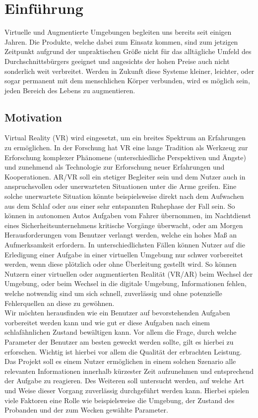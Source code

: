 \chapter{Einführung}

Virtuelle und Augmentierte Umgebungen begleiten uns bereits seit einigen Jahren. Die Produkte, welche dabei zum Einsatz kommen, sind zum jetzigen Zeitpunkt aufgrund der unpraktischen Größe nicht für das alltägliche Umfeld des Durchschnittsbürgers geeignet und angesichts der hohen Preise auch nicht sonderlich weit verbreitet.
Werden in Zukunft diese Systeme kleiner, leichter, oder sogar permanent mit dem menschlichen Körper verbunden, wird es möglich sein, jeden Bereich des Lebens zu augmentieren. 

\section{Motivation}

Virtual Reality (VR) wird eingesetzt, um ein breites Spektrum an Erfahrungen zu ermöglichen. In der Forschung hat VR eine lange Tradition als Werkzeug zur Erforschung komplexer Phänomene (unterschiedliche Perspektiven und Ängste) und zunehmend als Technologie zur Erforschung neuer Erfahrungen und Kooperationen.
AR/VR soll ein stetiger Begleiter sein und dem Nutzer auch in anspruchsvollen oder unerwarteten Situationen unter die Arme greifen.
Eine solche unerwartete Situation könnte beispielsweise direkt nach dem Aufwachen aus dem Schlaf oder aus einer sehr entspannten Ruhephase der Fall sein. So können in autonomen Autos Aufgaben vom Fahrer übernommen, im Nachtdienst eines Sicherheitsunternehmens kritische Vorgänge überwacht, oder am Morgen Herausforderungen vom Benutzer verlangt werden, welche ein hohes Maß an Aufmerksamkeit erfordern. 
In unterschiedlichsten Fällen können Nutzer auf die Erledigung einer Aufgabe in einer virtuellen Umgebung nur schwer vorbereitet werden, wenn diese plötzlich oder ohne Überleitung gestellt wird.
So können Nutzern einer virtuellen oder augmentierten Realität (VR/AR) beim Wechsel der Umgebung, oder beim Wechsel in die digitale Umgebung, Informationen fehlen, welche notwendig sind um sich schnell, zuverlässig und ohne potenzielle Fehlerquellen an diese zu gewöhnen.\\
Wir möchten herausfinden wie ein Benutzer auf bevorstehenden Aufgaben vorbereitet werden kann und wie gut er diese Aufgaben nach einem schlafähnlichen Zustand bewältigen kann. Vor allem die Frage, durch welche Parameter der Benutzer am besten geweckt werden sollte, gilt es hierbei zu erforschen. Wichtig ist hierbei vor allem die Qualität der erbrachten Leistung.\\
Das Projekt \projectName soll es einem Nutzer ermöglichen in einem solchen Szenario alle relevanten Informationen innerhalb kürzester Zeit aufzunehmen und entsprechend der Aufgabe zu reagieren. Des Weiteren soll untersucht werden, auf welche Art und Weise dieser Vorgang zuverlässig durchgeführt werden kann. Hierbei spielen viele Faktoren eine Rolle wie beispielsweise die Umgebung, der Zustand des Probanden und der zum Wecken gewählte Parameter.\\
